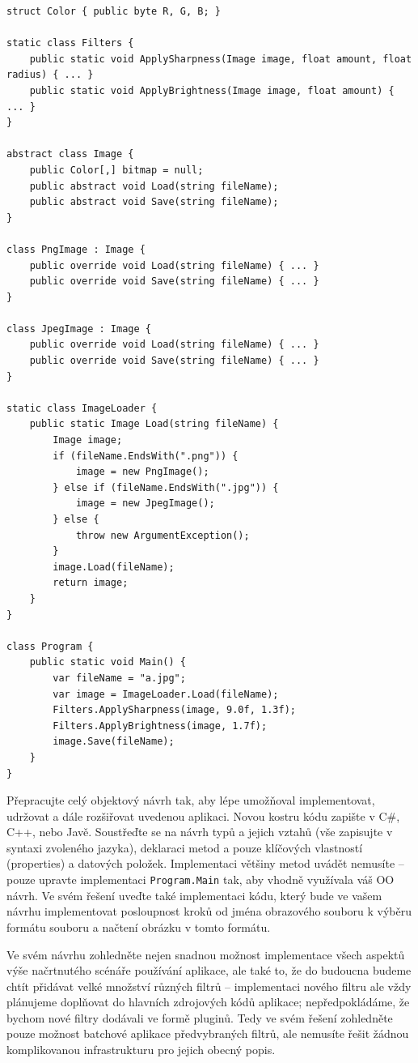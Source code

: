 \begin{lstlisting}[language={[Sharp]C}]
struct Color { public byte R, G, B; }

static class Filters {
    public static void ApplySharpness(Image image, float amount, float radius) { ... }
    public static void ApplyBrightness(Image image, float amount) { ... }
}

abstract class Image {
    public Color[,] bitmap = null;
    public abstract void Load(string fileName);
    public abstract void Save(string fileName);
}

class PngImage : Image {
    public override void Load(string fileName) { ... }
    public override void Save(string fileName) { ... }
}

class JpegImage : Image {
    public override void Load(string fileName) { ... }
    public override void Save(string fileName) { ... }
}

static class ImageLoader {
    public static Image Load(string fileName) {
        Image image;
        if (fileName.EndsWith(".png")) {
            image = new PngImage();
        } else if (fileName.EndsWith(".jpg")) {
            image = new JpegImage();
        } else {
            throw new ArgumentException();
        }
        image.Load(fileName);
        return image;
    }
}

class Program {
    public static void Main() {
        var fileName = "a.jpg";
        var image = ImageLoader.Load(fileName);
        Filters.ApplySharpness(image, 9.0f, 1.3f);
        Filters.ApplyBrightness(image, 1.7f);
        image.Save(fileName);
    }
}
\end{lstlisting}

Přepracujte celý objektový návrh tak, aby lépe umožňoval implementovat, udržovat
a dále rozšiřovat uvedenou aplikaci. Novou kostru kódu zapište v C\#, C++, nebo Javě.
Soustřeďte se na návrh typů a jejich vztahů (vše zapisujte v syntaxi zvoleného
jazyka), deklaraci metod a pouze klíčových vlastností (properties) a datových položek.
Implementaci většiny metod uvádět nemusíte -- pouze upravte implementaci
\texttt{Program.Main} tak, aby vhodně využívala váš OO návrh. Ve svém řešení uveďte
také implementaci kódu, který bude ve vašem návrhu implementovat posloupnost kroků
od jména obrazového souboru k výběru formátu souboru a načtení obrázku v tomto formátu.

\medskip
Ve svém návrhu zohledněte nejen snadnou možnost implementace všech aspektů výše
načrtnutého scénáře používání aplikace, ale také to, že do budoucna budeme chtít
přidávat velké množství různých filtrů -- implementaci nového filtru ale vždy
plánujeme doplňovat do hlavních zdrojových kódů aplikace; nepředpokládáme, že bychom
nové filtry dodávali ve formě pluginů. Tedy ve svém řešení zohledněte pouze možnost
batchové aplikace předvybraných filtrů, ale nemusíte řešit žádnou komplikovanou
infrastrukturu pro jejich obecný popis.

